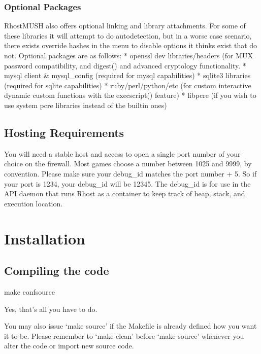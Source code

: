 \documentclass[letterpaper,10pt,english]{sphinxmanual}
\begin{document}
\subsubsection{Optional Packages}
\label{\detokenize{requirements:optional-packages}}
\sphinxAtStartPar
RhostMUSH also offers optional linking and library attachments.  For some of these libraries it will attempt to do auto\sphinxhyphen{}detection, but in a worse case scenario, there exists override hashes in the menu to disable options it thinks exist that do not.  Optional packages are as follows:
* openssl dev libraries/headers (for MUX password compatibility, and digest() and advanced cryptology functionality.
* mysql client \& mysql\_config (required for mysql capabilities)
* sqlite3 libraries (required for sqlite capabilities)
* ruby/perl/python/etc (for custom interactive dynamic custom functions with the execscript() feature)
* libpcre (if you wish to use system pcre libraries instead of the built\sphinxhyphen{}in ones)


\subsection{Hosting Requirements}
\label{\detokenize{requirements:hosting-requirements}}
\sphinxAtStartPar
You will need a stable host and access to open a single port number of your choice on the firewall.  Most games choose a number between 1025 and 9999, by convention.  Please make sure your debug\_id matches the port number + 5.  So if your port is 1234, your debug\_id will be 12345.  The debug\_id is for use in the API daemon that runs Rhost as a container to keep track of heap, stack, and execution location.


\section{Installation}
\label{\detokenize{installation:installation}}\label{\detokenize{installation::doc}}

\subsection{Compiling the code}
\label{\detokenize{installation:compiling-the-code}}
\sphinxAtStartPar
make confsource

\sphinxAtStartPar
Yes, that’s all you have to do.

\sphinxAtStartPar
You may also issue ‘make source’ if the Makefile is already defined how
you want it to be.  Please remember to ‘make clean’ before ‘make source’
whenever you alter the code or import new source code.
\end{document}
